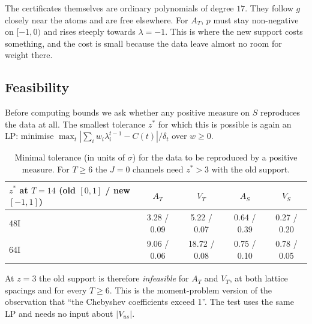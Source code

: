 \documentclass[11pt]{article}
\newcommand{\Vus}{|V_{us}|}
\theoremstyle{remark}
\begin{document}
The certificates themselves are ordinary polynomials of degree $17$. They follow $g$ closely near the atoms and are free elsewhere. For $A_T$, $p$ must stay non-negative on $[-1,0)$ and rises steeply towards $\lambda=-1$.
This is where the new support costs something, and the cost is small because the data leave almost no room for weight there.

\subsection{Feasibility}\label{sec:feas}
Before computing bounds we ask whether any positive measure on $S$ reproduces the data at all. The smallest tolerance $z^*$ for which this is possible is again an LP:
minimise $\max_t|\sum_i w_i\lambda_i^{t-1}-C(t)|/\delta_t$ over $w\ge0$.
\begin{table}[h]
\centering\small
\begin{tabular}{lcccc}
\toprule
$z^*$ at $T=14$ (old $[0,1]$ / new $[-1,1]$) & $A_T$ & $V_T$ & $A_S$ & $V_S$\\
\midrule
48I & 3.28 / 0.09 & 5.22 / 0.07 & 0.64 / 0.39 & 0.27 / 0.20\\
64I & 9.06 / 0.06 & 18.72 / 0.08 & 0.75 / 0.10 & 0.78 / 0.05\\
\bottomrule
\end{tabular}
\caption{Minimal tolerance (in units of $\sigma$) for the data to be reproduced by a positive measure. For $T\ge6$ the $J=0$ channels need $z^*>3$ with the old support.}
\end{table}
At $z=3$ the old support is therefore \emph{infeasible} for $A_T$ and $V_T$, at both lattice spacings and for every $T\ge6$.
This is the moment-problem version of the observation that ``the Chebyshev coefficients exceed 1''. The test uses the same LP and needs no input about $\Vus$.
\end{document}
